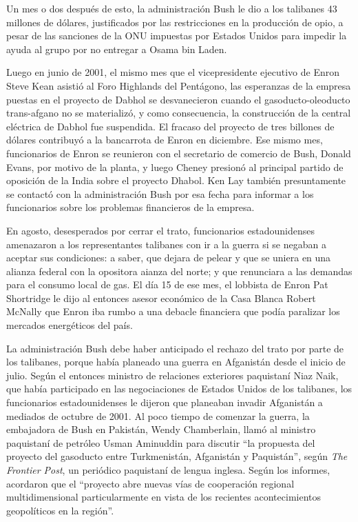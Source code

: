 \documentclass[10pt,a5paper,twoside,spanish,]{book}
\begin{document}
Un mes o dos después de esto, la administración Bush le dio a los
talibanes 43 millones de dólares, justificados por las restricciones en
la producción de opio, a pesar de las sanciones de la ONU impuestas por
Estados Unidos para impedir la ayuda al grupo por no entregar a Osama
bin Laden.

Luego en junio de 2001, el mismo mes que el vicepresidente ejecutivo de
Enron Steve Kean asistió al Foro Highlands del Pentágono, las esperanzas
de la empresa puestas en el proyecto de Dabhol se desvanecieron cuando
el gasoducto-oleoducto trans-afgano no se materializó, y como
consecuencia, la construcción de la central eléctrica de Dabhol fue
suspendida. El fracaso del proyecto de tres billones de dólares
contribuyó a la bancarrota de Enron en diciembre. Ese mismo mes,
funcionarios de Enron se reunieron con el secretario de comercio de
Bush, Donald Evans, por motivo de la planta, y luego Cheney presionó al
principal partido de oposición de la India sobre el proyecto Dhabol. Ken
Lay también presuntamente se contactó con la administración Bush por esa
fecha para informar a los funcionarios sobre los problemas financieros
de la empresa.

En agosto, desesperados por cerrar el trato, funcionarios
estadounidenses amenazaron a los representantes talibanes con ir a la
guerra si se negaban a aceptar sus condiciones: a saber, que dejara de
pelear y que se uniera en una alianza federal con la opositora aianza
del norte; y que renunciara a las demandas para el consumo local de gas.
El día 15 de ese mes, el lobbista de Enron Pat Shortridge le dijo al
entonces asesor económico de la Casa Blanca Robert McNally que Enron iba
rumbo a una debacle financiera que podía paralizar los mercados
energéticos del país.

La administración Bush debe haber anticipado el rechazo del trato por
parte de los talibanes, porque había planeado una guerra en Afganistán
desde el inicio de julio. Según el entonces ministro de relaciones
exteriores paquistaní Niaz Naik, que había participado en las
negociaciones de Estados Unidos de los talibanes, los funcionarios
estadounidenses le dijeron que planeaban invadir Afganistán a mediados
de octubre de 2001. Al poco tiempo de comenzar la guerra, la embajadora
de Bush en Pakistán, Wendy Chamberlain, llamó al ministro paquistaní de
petróleo Usman Aminuddin para discutir ``la propuesta del proyecto del
gasoducto entre Turkmenistán, Afganistán y Paquistán'', según \emph{The
Frontier Post}, un periódico paquistaní de lengua inglesa. Según los
informes, acordaron que el ``proyecto abre nuevas vías de cooperación
regional multidimensional particularmente en vista de los recientes
acontecimientos geopolíticos en la región''.
\end{document}
